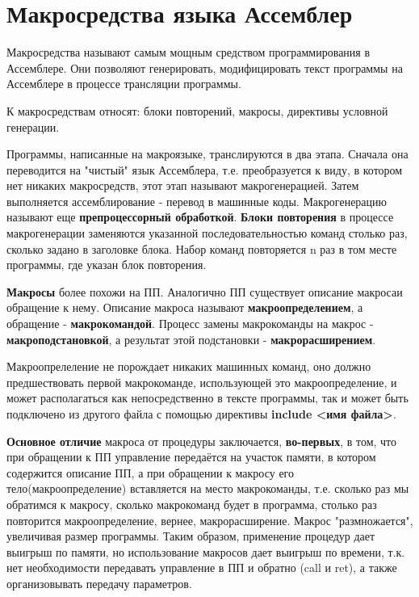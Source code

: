 \section{Макросредства языка Ассемблер}

Макросредства называют самым мощным средством программирования в Ассемблере. Они позволяют генерировать, модифицировать текст программы на Ассемблере в процессе трансляции программы.

К макросредствам относят: блоки повторений, макросы, директивы условной генерации.

Программы, написанные на макроязыке, транслируются в два этапа. Сначала она переводится на "чистый" язык Ассемблера, т.е. преобразуется к виду, в котором нет никаких макросредств, этот этап называют макрогенерацией. Затем выполняется ассемблирование - перевод в машинные коды. Макрогенерацию называют еще \textbf{препроцессорный обработкой}.
\textbf{Блоки повторения} в процессе макрогенерации заменяются указанной последовательностью команд столько раз, сколько задано в заголовке блока. Набор команд повторяется n раз в том месте программы, где указан блок повторения.

\textbf{Макросы} более похожи на ПП. Аналогично ПП существует описание макросаи обращение к нему. Описание макроса называют \textbf{макроопределением}, а обращение - \textbf{макрокомандой}. Процесс замены макрокоманды на макрос - \textbf{макроподстановкой}, а результат этой подстановки - \textbf{макрорасширением}.

Макроопрелеление не порождает никаких машинных команд, оно должно предшествовать первой макрокоманде, использующей это макроопределение, и может располагаться как непосредственно в тексте программы, так и может быть подключено из другого файла с помощью директивы \textbf{include <имя файла>}.

\textbf{Основное отличие} макроса от процедуры заключается, \textbf{во-первых}, в том, что при обращении к ПП управление передаётся на участок памяти, в котором содержится описание ПП, а при обращении к макросу его тело(макроопределение) вставляется на место макрокоманды, т.е. сколько раз мы обратимся к макросу, сколько макрокоманд будет в программа, столько раз повторится макроопределение, вернее, макрорасширение.
Макрос "размножается", увеличивая размер программы. Таким образом, применение процедур дает выигрыш по памяти, но использование макросов дает выигрыш по времени, т.к. нет необходимости передавать управление в ПП и обратно (call и ret), а также организовывать передачу параметров.

